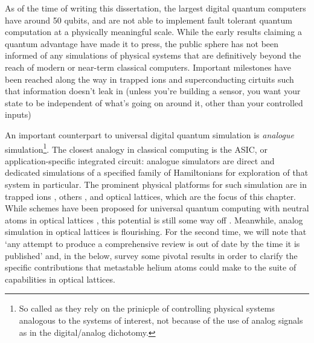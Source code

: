 	As of the time of writing this dissertation, the largest digital quantum computers have around 50 qubits, and are not able to implement fault tolerant quantum computation at a physically meaningful scale.
	While the early results claiming a quantum advantage have made it to press, the public sphere has not been informed of any simulations of physical systems that are definitively beyond the reach of modern or near-term classical computers.
	Important milestones have been reached along the way in trapped ions \cite{} and superconducting cirtuits \cite{}
	such that information doesn't leak in (unless you're building a sensor, you want your state to be independent of what's going on around it, other than your controlled inputs)

	An important counterpart to universal digital quantum simulation is \emph{analogue} simulation\footnote{So called as they rely on the prinicple of controlling physical systems analogous to the systems of interest, not because of the use of analog signals as in the digital/analog dichotomy.}.
	The closest analogy in classical computing is the ASIC, or application-specific integrated circuit: analogue simulators are direct and dedicated simulations of a specified family of Hamiltonians for exploration of that system in particular.
	The prominent physical platforms for such simulation are in trapped ions \cite{}, others \cite{}, and optical lattices, which are the focus of this chapter.
	While schemes have been proposed for universal quantum computing with neutral atoms in optical lattices \cite{Brennen99,Henriet20}, this potential is still some way off \cite{Markov00}.
	Meanwhile, analog simulation in optical lattices is flourishing.
	For the second time, we will note that `any attempt to produce a comprehensive review is out of date by the time it is published' and, in the below, survey some pivotal results in order to clarify the specific contributions that metastable helium atoms could make to the suite of capabilities in optical lattices.

